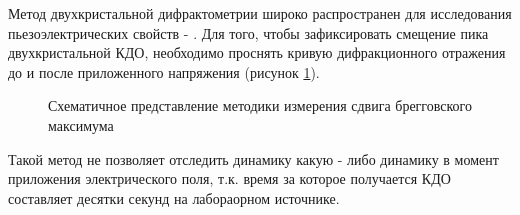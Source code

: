 Метод двухкристальной дифрактометрии широко распространен для исследования пьезоэлектрических свойств \cite{piezo51} - \cite{piezo54}.
Для того, чтобы зафиксировать смещение пика двухкристальной КДО, необходимо проснять кривую дифракционного отражения
до и после приложенного напряжения (рисунок \ref{ris:piezo_classic}).
\begin{figure}[H]
  \centering
  \hfill
  \hfill

  \caption{Схематичное представление методики измерения сдвига брегговского максимума}
  \label{ris:piezo_classic}
\end{figure}
  Такой метод не позволяет отследить динамику какую - либо динамику в момент приложения электрического поля,
  т.к. время за которое получается КДО составляет десятки секунд на лабораорном источнике.
